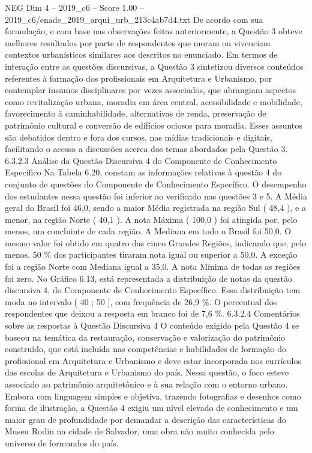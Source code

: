 \begin{textsample}{NEG Dim 4 – 2019\_c6 – Score 1.00 – 2019\_c6/enade\_2019\_arqui\_urb\_213c4ab7d4.txt}
De acordo com sua formulação, e com base nas observações feitas anteriormente, a Questão 3 obteve melhores resultados por parte de respondentes que moram ou vivenciam contextos urbanísticos similares aos descritos no enunciado.
Em termos de interação entre as questões discursivas, a Questão 3 sintetizou diversos conteúdos referentes à formação dos profissionais em Arquitetura e Urbanismo, por contemplar insumos disciplinares por vezes associados, que abrangiam aspectos como revitalização urbana, moradia em área central, acessibilidade e mobilidade, favorecimento à caminhabilidade, alternativas de renda, preservação de patrimônio cultural e conversão de edifícios ociosos para moradia.
Esses assuntos são debatidos dentro e fora dos cursos, nas mídias tradicionais e digitais, facilitando o acesso a discussões acerca dos temas abordados pela Questão 3. 6.3.2.3 Análise da Questão Discursiva 4 do Componente de Conhecimento Específico Na Tabela 6.20, constam as informações relativas à questão 4 do conjunto de questões do Componente de Conhecimento Específico.
O desempenho dos estudantes nessa questão foi inferior ao verificado nas questões 3 e 5.
A Média geral do Brasil foi 46,0, sendo a maior Média registrada na região Sul ( 48,4 ), e a menor, na região Norte ( 40,1 ).
A nota Máxima ( 100,0 ) foi atingida por, pelo menos, um concluinte de cada região.
A Mediana em todo o Brasil foi 50,0.
O mesmo valor foi obtido em quatro das cinco Grandes Regiões, indicando que, pelo menos, 50 \% dos participantes tiraram nota igual ou superior a 50,0.
A exceção foi a região Norte com Mediana igual a 35,0.
A nota Mínima de todas as regiões foi zero.
No Gráfico 6.13, está representada a distribuição de notas da questão discursiva 4, do Componente de Conhecimento Específico.
Essa distribuição tem moda no intervalo ( 40 ; 50 ], com frequência de 26,9 \%.
O percentual dos respondentes que deixou a resposta em branco foi de 7,6 \%. 6.3.2.4 Comentários sobre as respostas à Questão Discursiva 4 O conteúdo exigido pela Questão 4 se baseou na temática da restauração, conservação e valorização do patrimônio construído, que está incluída nas competências e habilidades de formação do profissional em Arquitetura e Urbanismo e deve estar incorporada nos currículos das escolas de Arquitetura e Urbanismo do país.
Nessa questão, o foco esteve associado ao patrimônio arquitetônico e à sua relação com o entorno urbano.
Embora com linguagem simples e objetiva, trazendo fotografias e desenhos como forma de ilustração, a Questão 4 exigiu um nível elevado de conhecimento e um maior grau de profundidade por demandar a descrição das características do Museu Rodin na cidade de Salvador, uma obra não muito conhecida pelo universo de formandos do país.

\end{textsample}
